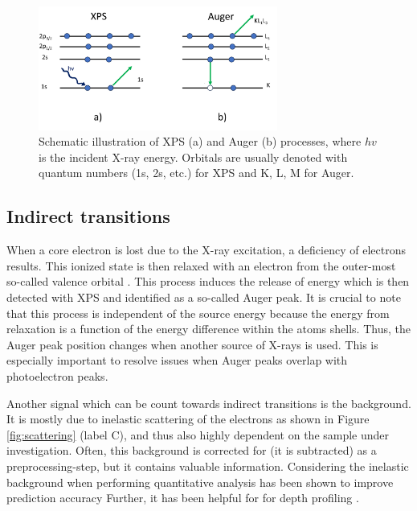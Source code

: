 \begin{figure}[H]
    \centering
    \includegraphics[width=0.7\textwidth]{Figures/AUGER_XPS.png}
    \caption{Schematic illustration of XPS (a) and Auger (b) processes, where $hv$ is the incident X-ray energy. Orbitals are usually denoted with quantum numbers (1s, 2s, etc.) for XPS and K, L, M for Auger.}
    \label{fig:augerxps}
\end{figure}

\subsection{Indirect transitions}
When a core electron is lost due to the X-ray excitation, a deficiency of electrons results. This ionized state is then relaxed with an electron from the outer-most so-called valence orbital \cite{stevie_introduction_2020}. This process induces the release of energy which is then detected with XPS and identified as a so-called Auger peak. It is crucial to note that this process is independent of the source energy because the energy from relaxation is a function of the energy difference within the atoms shells. Thus, the Auger peak position changes when another source of X-rays is used. This is especially important to resolve issues when Auger peaks overlap with photoelectron peaks.

Another signal which can be count towards indirect transitions is the background. It is mostly due to inelastic scattering of the electrons as shown in Figure \ref{fig:scattering} (label C), and thus also highly dependent on the sample under investigation. Often, this background is corrected for (it is subtracted) as a preprocessing-step, but it contains valuable information. Considering the inelastic background when performing quantitative analysis has been shown to improve prediction accuracy \cite{tougaard_practical_2020} Further, it has been helpful for for depth profiling \cite{bure_assessing_2023}.

